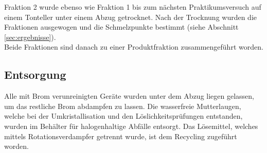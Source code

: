 Fraktion 2 wurde ebenso wie Fraktion 1 bis zum nächsten Praktikumsversuch auf einem Tonteller unter einem Abzug getrocknet. Nach der Trocknung wurden die Fraktionen ausgewogen und die Schmelzpunkte bestimmt (siehe Abschnitt \ref{sec:ergebnisse}).\\
Beide Fraktionen sind danach zu einer Produktfraktion zusammengeführt worden.\\

\subsection*{Entsorgung}
Alle mit Brom verunreinigten Geräte wurden unter dem Abzug liegen gelassen, um das restliche Brom abdampfen zu lassen. Die wasserfreie Mutterlaugen, welche bei der Umkristallisation und den Löslichkeitsprüfungen entstanden, wurden im Behälter für halogenhaltige Abfälle entsorgt. Das Lösemittel, welches mittels Rotationsverdampfer getrennt wurde, ist dem Recycling zugeführt worden.
